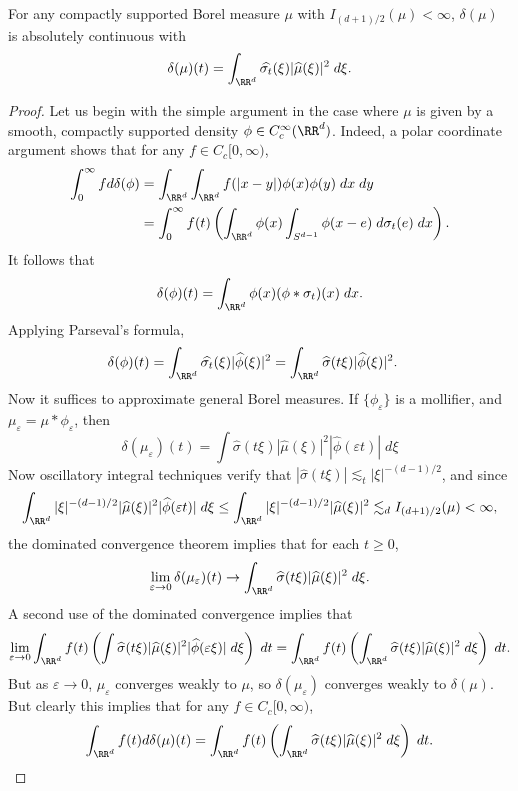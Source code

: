 \begin{lemma}
	For any compactly supported Borel measure $\mu$ with $I_{(d+1)/2}(\mu) < \infty$, $\delta(\mu)$ is absolutely continuous with
	\[ \delta(\mu)(t) = \int_{\RR^d} \widehat{\sigma_t}(\xi) |\widehat{\mu}(\xi)|^2\; d\xi. \]
\end{lemma}
\begin{proof}
	Let us begin with the simple argument in the case where $\mu$ is given by a smooth, compactly supported density $\phi \in C_c^\infty(\RR^d)$. Indeed, a polar coordinate argument shows that for any $f \in C_c[0,\infty)$,
	\begin{align*}
		\int_0^\infty f d\delta(\phi) &= \int_{\RR^d} \int_{\RR^d} f(|x-y|) \phi(x) \phi(y)\; dx\; dy\\
		&= \int_0^\infty f(t) \left( \int_{\RR^d} \phi(x) \int_{S^{d-1}} \phi(x - e)\; d\sigma_t(e)\; dx \right).
	\end{align*}
	It follows that 
	\[ \delta(\phi)(t) = \int_{\RR^d} \phi(x) (\phi * \sigma_t)(x)\; dx. \]
	Applying Parseval's formula,
	\begin{align*}
		\delta(\phi)(t) &= \int_{\RR^d} \widehat{\sigma_t}(\xi) |\widehat{\phi}(\xi)|^2 = \int_{\RR^d} \widehat{\sigma}(t \xi) |\widehat{\phi}(\xi)|^2.
	\end{align*}
	Now it suffices to approximate general Borel measures. If $\{ \phi_\varepsilon \}$ is a mollifier, and $\mu_\varepsilon = \mu * \phi_\varepsilon$, then
	\[ \delta(\mu_\varepsilon)(t) = \int \widehat{\sigma}(t \xi) |\widehat{\mu}(\xi)|^2 |\widehat{\phi}(\varepsilon t)|\; d\xi \]
	Now oscillatory integral techniques verify that $|\widehat{\sigma}(t\xi)| \lesssim_t |\xi|^{-(d-1)/2}$, and since
	\[ \int_{\RR^d} |\xi|^{-(d-1)/2} |\widehat{\mu}(\xi)|^2 |\widehat{\phi}(\varepsilon t)|\; d\xi \leq \int_{\RR^d} |\xi|^{-(d-1)/2} |\widehat{\mu}(\xi)|^2 \lesssim_d I_{(d+1)/2}(\mu) < \infty, \]
	the dominated convergence theorem implies that for each $t \geq 0$,
	\[ \lim_{\varepsilon \to 0} \delta(\mu_\varepsilon)(t) \to \int_{\RR^d} \widehat{\sigma}(t \xi) |\widehat{\mu}(\xi)|^2\; d\xi. \]
	A second use of the dominated convergence implies that
	\[ \lim_{\varepsilon \to 0} \int_{\RR^d} f(t) \left( \int \widehat{\sigma}(t \xi) |\widehat{\mu}(\xi)|^2 |\widehat{\phi}(\varepsilon \xi)|\; d\xi \right)\; dt = \int_{\RR^d} f(t) \left( \int_{\RR^d} \widehat{\sigma}(t \xi) |\widehat{\mu}(\xi)|^2\; d\xi \right)\; dt. \]
	But as $\varepsilon \to 0$, $\mu_\varepsilon$ converges weakly to $\mu$, so $\delta(\mu_\varepsilon)$ converges weakly to $\delta(\mu)$. But clearly this implies that for any $f \in C_c[0,\infty)$,
	\[ \int_{\RR^d} f(t) d\delta(\mu)(t) = \int_{\RR^d} f(t) \left( \int_{\RR^d} \widehat{\sigma}(t \xi) |\widehat{\mu}(\xi)|^2\; d\xi \right)\; dt. \qedhere \]
\end{proof}

